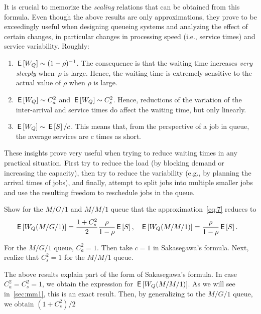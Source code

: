 It is crucial to memorize the \emph{scaling} relations that can be obtained from this formula.
Even though the above results are only approximations, they prove to be exceedingly useful when designing queueing systems and analyzing the effect of certain changes, in particular changes in processing speed (i.e., service times) and service variability.
Roughly:
\begin{enumerate}
\item $\,\mathsf{E}\left[W_Q\right] \sim (1-\rho)^{-1}$. The consequence is that the waiting
 time increases \emph{very steeply} when~$\rho$ is large. Hence, the waiting time is
extremely sensitive to the actual value of $\rho$ when $\rho$ is large. 
\item $\,\mathsf{E}\left[W_Q\right] \sim C_a^2$ and $\,\mathsf{E}\left[W_Q\right] \sim C_s^2$.
 Hence, reductions of the variation of the inter-arrival and service times do affect the waiting time, but only linearly.
\item $\,\mathsf{E}\left[W_Q\right] \sim \,\mathsf{E}\left[S\right]/c$. This means that, from the perspective of a job in queue,  the average services are $c$ times as short. 
\end{enumerate}

These insights prove very useful when trying to reduce waiting times in any practical situation.
First try to reduce the load (by blocking demand or increasing the capacity), then try to reduce the variability (e.g., by planning the arrival times of jobs), and finally, attempt to split jobs into multiple smaller jobs and use the resulting freedom to reschedule jobs in the queue.




\begin{exercise}
 Show for the  $M/G/1$ and $M/M/1$ queue that  the approximation~\cref{eq:7} reduces to
\begin{align*}
  \,\mathsf{E}\left[W_Q(M/G/1)\right] &= \frac{1+C_s^2}2\frac{\rho}{1-\rho} \,\mathsf{E}\left[S\right], & 
  \,\mathsf{E}\left[W_Q(M/M/1)\right] &= \frac{\rho}{1-\rho} \,\mathsf{E}\left[S\right].
\end{align*}
\begin{solution}
For the $M/G/1$ queue, $C_a^2=1$. Then take $c=1$ in Sakasegawa's formula. Next, realize that $C_s^2=1$ for the $M/M/1$ queue. 
\end{solution}
\end{exercise}
The above results explain part of the form of Sakasegawa's formula. In case $C_a^2=C_s^2=1$, we obtain the expression for $\,\mathsf{E}\left[W_Q(M/M/1)\right]$. 
As we will see in~\cref{sec:mm1}, this is an exact result. Then, by generalizing to the $M/G/1$ queue, we obtain $(1+C_s^2)/2$

